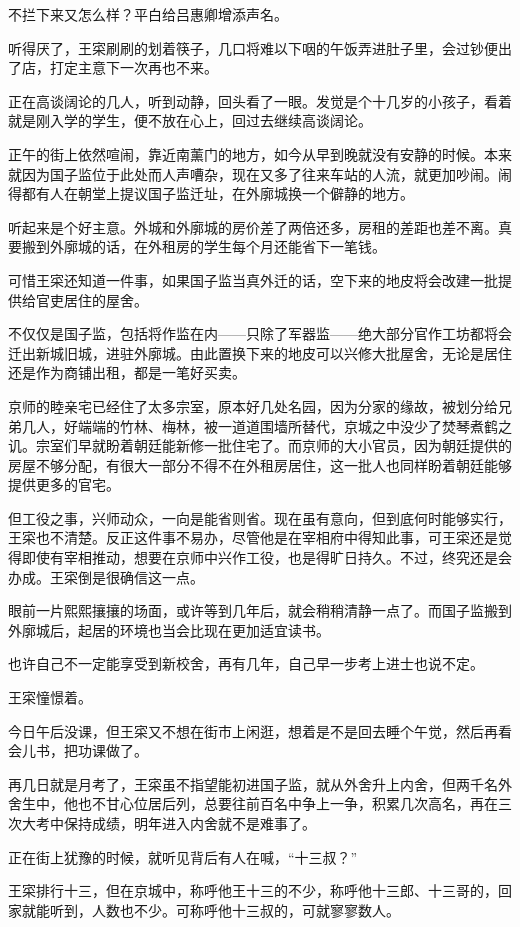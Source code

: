 不拦下来又怎么样？平白给吕惠卿增添声名。

听得厌了，王寀刷刷的划着筷子，几口将难以下咽的午饭弄进肚子里，会过钞便出了店，打定主意下一次再也不来。

正在高谈阔论的几人，听到动静，回头看了一眼。发觉是个十几岁的小孩子，看着就是刚入学的学生，便不放在心上，回过去继续高谈阔论。

正午的街上依然喧闹，靠近南薰门的地方，如今从早到晚就没有安静的时候。本来就因为国子监位于此处而人声嘈杂，现在又多了往来车站的人流，就更加吵闹。闹得都有人在朝堂上提议国子监迁址，在外廓城换一个僻静的地方。

听起来是个好主意。外城和外廓城的房价差了两倍还多，房租的差距也差不离。真要搬到外廓城的话，在外租房的学生每个月还能省下一笔钱。

可惜王寀还知道一件事，如果国子监当真外迁的话，空下来的地皮将会改建一批提供给官吏居住的屋舍。

不仅仅是国子监，包括将作监在内——只除了军器监——绝大部分官作工坊都将会迁出新城旧城，进驻外廓城。由此置换下来的地皮可以兴修大批屋舍，无论是居住还是作为商铺出租，都是一笔好买卖。

京师的睦亲宅已经住了太多宗室，原本好几处名园，因为分家的缘故，被划分给兄弟几人，好端端的竹林、梅林，被一道道围墙所替代，京城之中没少了焚琴煮鹤之讥。宗室们早就盼着朝廷能新修一批住宅了。而京师的大小官员，因为朝廷提供的房屋不够分配，有很大一部分不得不在外租房居住，这一批人也同样盼着朝廷能够提供更多的官宅。

但工役之事，兴师动众，一向是能省则省。现在虽有意向，但到底何时能够实行，王寀也不清楚。反正这件事不易办，尽管他是在宰相府中得知此事，可王寀还是觉得即使有宰相推动，想要在京师中兴作工役，也是得旷日持久。不过，终究还是会办成。王寀倒是很确信这一点。

眼前一片熙熙攘攘的场面，或许等到几年后，就会稍稍清静一点了。而国子监搬到外廓城后，起居的环境也当会比现在更加适宜读书。

也许自己不一定能享受到新校舍，再有几年，自己早一步考上进士也说不定。

王寀憧憬着。

今日午后没课，但王寀又不想在街市上闲逛，想着是不是回去睡个午觉，然后再看会儿书，把功课做了。

再几日就是月考了，王寀虽不指望能初进国子监，就从外舍升上内舍，但两千名外舍生中，他也不甘心位居后列，总要往前百名中争上一争，积累几次高名，再在三次大考中保持成绩，明年进入内舍就不是难事了。

正在街上犹豫的时候，就听见背后有人在喊，“十三叔？”

王寀排行十三，但在京城中，称呼他王十三的不少，称呼他十三郎、十三哥的，回家就能听到，人数也不少。可称呼他十三叔的，可就寥寥数人。

